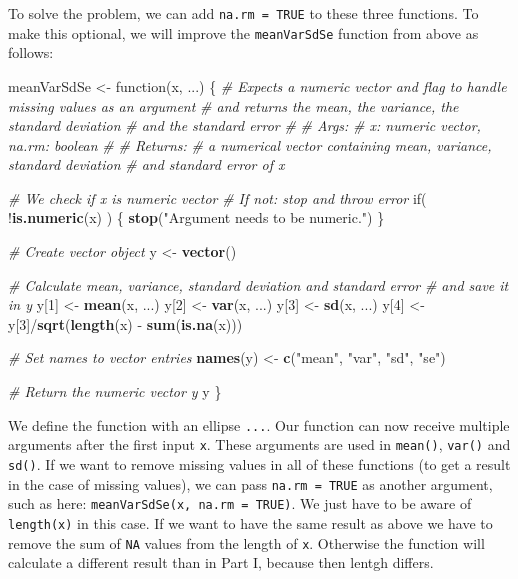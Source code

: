 \documentclass[11,]{article}
\newenvironment{Shaded}{\begin{snugshade}}{\end{snugshade}}
\newcommand{\KeywordTok}[1]{\textcolor[rgb]{0.13,0.29,0.53}{\textbf{{#1}}}}
\newcommand{\DecValTok}[1]{\textcolor[rgb]{0.00,0.00,0.81}{{#1}}}
\newcommand{\StringTok}[1]{\textcolor[rgb]{0.31,0.60,0.02}{{#1}}}
\newcommand{\CommentTok}[1]{\textcolor[rgb]{0.56,0.35,0.01}{\textit{{#1}}}}
\newcommand{\NormalTok}[1]{{#1}}
\begin{document}
To solve the problem, we can add \texttt{na.rm = TRUE} to these three
functions. To make this optional, we will improve the
\texttt{meanVarSdSe} function from above as follows:

\begin{Shaded}
\begin{Highlighting}[]
\NormalTok{meanVarSdSe <-}\StringTok{ }\NormalTok{function(x, ...) \{}
  \CommentTok{# Expects a numeric vector and flag to handle missing values as an argument}
  \CommentTok{# and returns the mean, the variance, the standard deviation}
  \CommentTok{# and the standard error}
  \CommentTok{# }
  \CommentTok{# Args:}
  \CommentTok{#   x: numeric vector, na.rm: boolean}
  \CommentTok{#}
  \CommentTok{# Returns:}
  \CommentTok{#   a numerical vector containing mean, variance, standard deviation}
  \CommentTok{#   and standard error of x}
  
  \CommentTok{# We check if x is numeric vector}
  \CommentTok{# If not: stop and throw error}
  \NormalTok{if( !}\KeywordTok{is.numeric}\NormalTok{(x) ) \{}
    \KeywordTok{stop}\NormalTok{(}\StringTok{"Argument needs to be numeric."}\NormalTok{)}
  \NormalTok{\}}
  
  \CommentTok{# Create vector object}
  \NormalTok{y <-}\StringTok{ }\KeywordTok{vector}\NormalTok{()}
  
  \CommentTok{# Calculate mean, variance, standard deviation and standard error}
  \CommentTok{# and save it in y}
  \NormalTok{y[}\DecValTok{1}\NormalTok{] <-}\StringTok{ }\KeywordTok{mean}\NormalTok{(x, ...)}
  \NormalTok{y[}\DecValTok{2}\NormalTok{] <-}\StringTok{ }\KeywordTok{var}\NormalTok{(x, ...)}
  \NormalTok{y[}\DecValTok{3}\NormalTok{] <-}\StringTok{ }\KeywordTok{sd}\NormalTok{(x, ...)}
  \NormalTok{y[}\DecValTok{4}\NormalTok{] <-}\StringTok{ }\NormalTok{y[}\DecValTok{3}\NormalTok{]/}\KeywordTok{sqrt}\NormalTok{(}\KeywordTok{length}\NormalTok{(x) -}\StringTok{ }\KeywordTok{sum}\NormalTok{(}\KeywordTok{is.na}\NormalTok{(x)))}
  
  \CommentTok{# Set names to vector entries}
  \KeywordTok{names}\NormalTok{(y) <-}\StringTok{ }\KeywordTok{c}\NormalTok{(}\StringTok{"mean"}\NormalTok{, }\StringTok{"var"}\NormalTok{, }\StringTok{"sd"}\NormalTok{, }\StringTok{"se"}\NormalTok{)}
  
  \CommentTok{# Return the numeric vector y}
  \NormalTok{y}
\NormalTok{\}}
\end{Highlighting}
\end{Shaded}

We define the function with an ellipse \texttt{...}. Our function can
now receive multiple arguments after the first input \texttt{x}. These
arguments are used in \texttt{mean()}, \texttt{var()} and \texttt{sd()}.
If we want to remove missing values in all of these functions (to get a
result in the case of missing values), we can pass \texttt{na.rm = TRUE}
as another argument, such as here:
\texttt{meanVarSdSe(x, na.rm = TRUE)}. We just have to be aware of
\texttt{length(x)} in this case. If we want to have the same result as
above we have to remove the sum of \texttt{NA} values from the length of
\texttt{x}. Otherwise the function will calculate a different result
than in Part I, because then lentgh differs.
\end{document}
